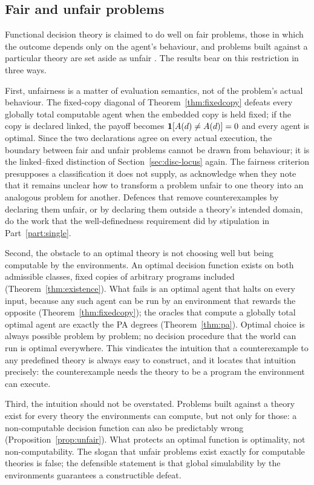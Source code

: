 \subsection{Fair and unfair problems}\label{sec:disc-fair}

Functional decision theory is claimed to do well on fair problems, those in which the outcome depends
only on the agent's behaviour, and problems built against a particular theory are set aside as
unfair \autocite{yudkowskysoares2017}. The results bear on this restriction in three ways.

First, unfairness is a matter of evaluation semantics, not of the problem's actual behaviour. The
fixed-copy diagonal of Theorem~\ref{thm:fixedcopy} defeats every globally total computable agent when
the embedded copy is held fixed; if the copy is declared linked, the payoff becomes
$\mathbf{1}[A(d)\ne A(d)]=0$ and every agent is optimal. Since the two declarations agree on every actual
execution, the boundary between fair and unfair problems cannot be drawn from behaviour; it is the
linked--fixed distinction of Section~\ref{sec:disc-locus} again. The fairness criterion presupposes a
classification it does not supply, as \textcite[§9, n.~15]{yudkowskysoares2017} acknowledge when they note
that it remains unclear how to transform a problem unfair to one theory into an analogous problem for
another. Defences that remove counterexamples by declaring them unfair, or by declaring them outside a
theory's intended domain, do the work that the well-definedness requirement did by stipulation in
Part~\ref{part:single}.

Second, the obstacle to an optimal theory is not choosing well but being computable by the
environments. An optimal decision function exists on both admissible classes, fixed copies of
arbitrary programs included (Theorem~\ref{thm:existence}). What fails is an optimal agent that halts
on every input, because any such agent can be run by an environment that rewards the opposite
(Theorem~\ref{thm:fixedcopy}); the oracles that compute a globally total optimal agent are exactly
the PA degrees
(Theorem~\ref{thm:pa}). Optimal choice is always possible problem by problem; no decision procedure
that the world can run is optimal everywhere. This vindicates the intuition that a counterexample to
any predefined theory is always easy to construct, and it locates that intuition precisely: the
counterexample needs the theory to be a program the environment can execute.

Third, the intuition should not be overstated. Problems built against a theory exist for every
theory the environments can compute, but not only for those: a non-computable decision function can
also be predictably wrong (Proposition~\ref{prop:unfair}). What protects an optimal function is
optimality, not non-computability. The slogan that unfair problems exist exactly for computable
theories is false; the defensible statement is that global simulability by the environments
guarantees a constructible defeat.

